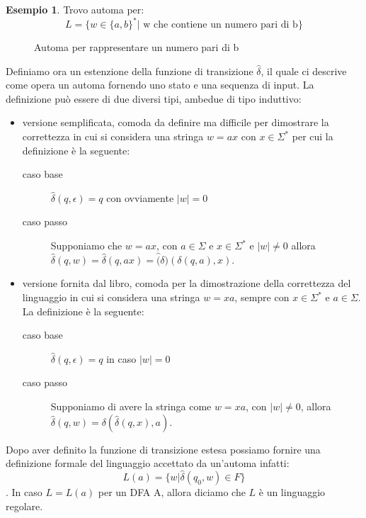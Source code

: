 \documentclass[a4paper]{book}
\theoremstyle{definition}%
\newtheorem*{esempio}{Esempio}
\begin{document}
\begin{esempio}
Trovo automa per: \[L=\{w\in\{a,b\}^*|\mbox{ w che contiene un numero pari di b}\} \]
\begin{figure}
\caption{Automa per rappresentare un numero pari di b}
\end{figure}
\end{esempio}
Definiamo ora un estenzione della funzione di transizione $\hat{\delta}$, il quale ci descrive
come opera un automa fornendo uno stato e una sequenza di input.
La definizione può essere di due diversi tipi, ambedue di tipo induttivo:
\begin{itemize}
  \item versione semplificata, comoda da definire ma difficile per dimostrare la correttezza
        in cui si considera una stringa $w = ax$ con $x \in \Sigma^*$ per cui la definizione è la seguente:
        \begin{description}
          \item [caso base] $\hat{\delta}(q, \epsilon) = q$ con ovviamente $|w| = 0$
          \item [caso passo] Supponiamo che $w = ax$, con $a \in \Sigma$ e $x \in \Sigma^*$ e $|w| \neq 0$
                 allora $\hat{\delta}(q, w) = \hat{\delta}(q, ax) = \hat(\delta)(\delta(q, a), x)$.
        \end{description}

  \item versione fornita dal libro, comoda per la dimostrazione della correttezza del linguaggio
        in cui si considera una stringa $w = xa$, sempre con $x \in \Sigma^*$ e $a \in \Sigma$.
        La definizione è la seguente:
        \begin{description}
          \item [caso base] $\hat{\delta}(q, \epsilon) = q$ in caso $|w| = 0$
          \item [caso passo] Supponiamo di avere la stringa come $w = xa$, con $|w| \neq 0$,
                allora $\hat{\delta}(q, w) = \delta(\hat{\delta}(q, x), a)$.
        \end{description}
\end{itemize}
Dopo aver definito la funzione di transizione estesa possiamo fornire una definizione formale
del linguaggio accettato da un'automa infatti:
\[ L(a) = \{w | \hat{\delta}(q_0, w) \in F \} \].
In caso $L = L(a)$ per un DFA A, allora diciamo che $L$ è un linguaggio regolare.
\end{document}
